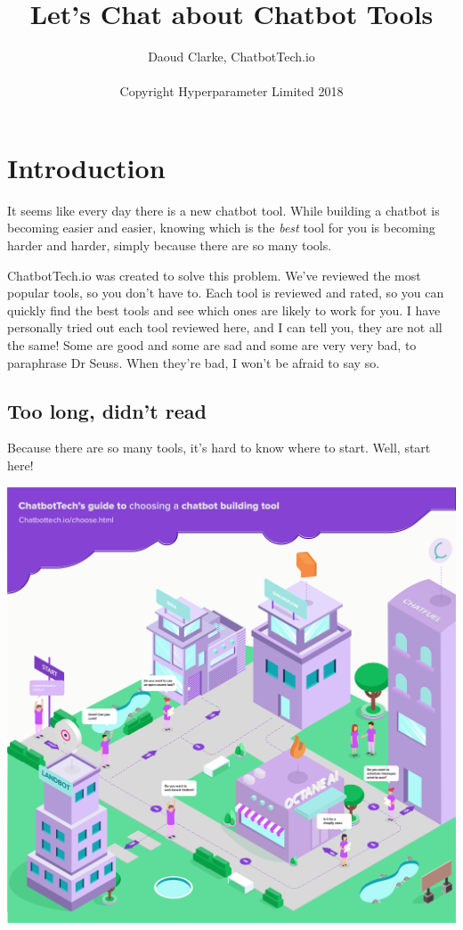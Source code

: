 \documentclass[ebook,article,11pt]{memoir}
\author{Daoud Clarke, ChatbotTech.io\\
  \\
  Copyright Hyperparameter Limited 2018}
\title{\textbf{Let's Chat about Chatbot Tools}}
\date{}
\begin{document}
\maketitle

\chapter{Introduction}

It seems like every day there is a new chatbot tool. While building a
chatbot is becoming easier and easier, knowing which is the
\emph{best} tool for you is becoming harder and harder, simply because
there are so many tools.

ChatbotTech.io was created to solve this problem. We've reviewed the
most popular tools, so you don't have to. Each tool is reviewed and
rated, so you can quickly find the best tools and see which ones are
likely to work for you. I have personally tried out each tool reviewed
here, and I can tell you, they are not all the same! Some are good and
some are sad and some are very very bad, to paraphrase Dr Seuss. When
they're bad, I won't be afraid to say so.

\section*{Too long, didn't read}

Because there are so many tools, it's hard to know where to
start. Well, start here!

\begin{center}
\includegraphics[width=\textwidth]{guide.png}
\end{center}
\end{document}
